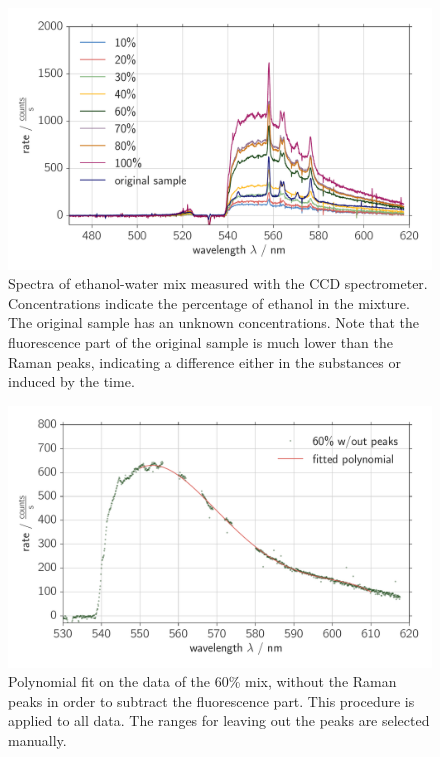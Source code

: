 \begin{figure}[htpb]
    \centering
    \includegraphics[width=0.8\linewidth]{analysis/figures/ccd_ethanol_spectra}
    \caption{
        Spectra of ethanol-water mix measured with the CCD spectrometer. Concentrations 
        indicate the percentage of ethanol in the mixture. The original sample has an unknown
        concentrations. Note that the fluorescence part of the original sample is much 
        lower than the Raman peaks, indicating a difference either in the substances or
        induced by the time.
        }
    \label{fig:ccd_ethanol_spectra}
\end{figure}

\begin{figure}[htpb]
    \centering
    \includegraphics[width=0.8\linewidth]{analysis/figures/ccd_ethanol_fluorescence}
    \caption{
        Polynomial fit on the data of the 60\% mix, without the Raman peaks in order to subtract 
        the fluorescence part. This procedure is applied to all data. The ranges for leaving out 
        the peaks are selected manually.
        }
    \label{fig:ccd_ethanol_fluorescence}
\end{figure}

